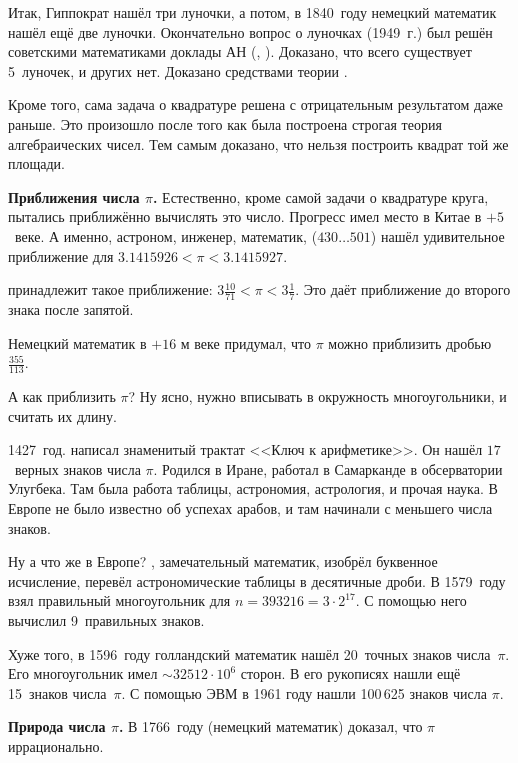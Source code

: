 \documentclass[a4paper,oneside,fleqn,10pt]{article}
\newcommand{\pe}[2]{${#1}\ldots{#2}$}
\begin{document}
Итак, Гиппократ нашёл три луночки, а потом, в 1840~году немецкий
математик  нашёл ещё две луночки.  Окончательно вопрос о
луночках (1949~г.) был решён советскими математиками доклады АН
(, ).  Доказано, что всего существует
5~луночек, и других нет.  Доказано средствами теории .

Кроме того, сама задача о квадратуре решена с отрицательным
результатом даже раньше.  Это произошло после того как была построена
строгая теория алгебраических чисел. Тем самым доказано, что нельзя
построить квадрат той же площади.

\textbf{Приближения числа $\pi$.}  Естественно, кроме самой задачи о
квадратуре круга, пытались приближённо вычислять это число. Прогресс
имел место в Китае в $+5$~веке. А именно, астроном, инженер,
математик,  (\pe{430}{501}) нашёл удивительное
приближение для $3.1415926 < \pi < 3.1415927$.

 принадлежит такое приближение:
$3\frac{10}{71} < \pi < 3 \frac{1}{7}$.  Это даёт приближение до
второго знака после запятой.

Немецкий математик  в $+16$ м веке придумал, что $\pi$
можно приблизить дробью $\frac{355}{113}$.

А как приблизить $\pi$? Ну ясно, нужно вписывать в окружность
многоугольники, и считать их длину.

1427~год.  написал знаменитый трактат <<Ключ к
арифметике>>. Он нашёл $17$~верных знаков числа $\pi$.  Родился в
Иране, работал в Самарканде в обсерватории Улугбека. Там была работа
таблицы, астрономия, астрология, и прочая наука. В Европе не было
известно об успехах арабов, и там начинали с меньшего числа знаков.

Ну а что же в Европе? , замечательный
математик, изобрёл буквенное исчисление, перевёл астрономические
таблицы в десятичные дроби. В 1579~году взял правильный многоугольник
для $n = 393216 = 3\cdot 2^{17}$.  С помощью него вычислил
9~правильных знаков.

Хуже того, в 1596~году голландский математик  нашёл 20~точных знаков числа~$\pi$.
Его многоугольник имел $\sim32512\cdot 10^6$ сторон. В его рукописях
нашли ещё 15~знаков числа~$\pi$.  С помощью ЭВМ в 1961 году нашли
100\,625 знаков числа $\pi$.

\textbf{Природа числа $\pi$.}  В 1766~году  (немецкий математик) доказал, что $\pi$
иррационально.
\end{document}
